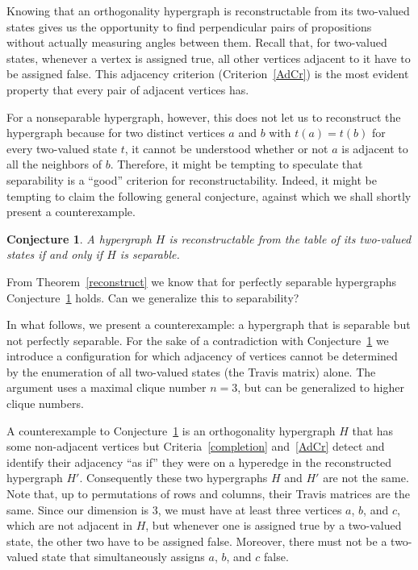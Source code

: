 \documentclass[%
12pt,
prereprint,
showpacs,
showkeys,
preprintnumbers,
amsmath,amssymb,
aps,
pra,
longbibliography,
notitlepage
]{revtex4-1}
\newtheorem{conjecture}[theorem]{{\color{THM}Conjecture}}
\theoremstyle{definition}
\begin{document}
	Knowing that an orthogonality hypergraph is reconstructable from its  two-valued states gives us the opportunity to find perpendicular pairs of propositions without actually measuring angles between them.
	Recall that, for two-valued states, whenever a vertex is assigned true, all other vertices adjacent to it have to be assigned false. This adjacency criterion (Criterion~\ref{AdCr}) is the most evident property that every pair of adjacent vertices has.
	
	For a nonseparable hypergraph, however, this does not let us to reconstruct the hypergraph because for two distinct vertices $a$ and $b$ with $t(a)=t(b)$ for every two-valued state $t$, it cannot be understood whether or not $a$ is adjacent to all the neighbors of $b$.
	Therefore, it might be tempting to speculate that separability is a ``good'' criterion for reconstructability. Indeed, it might be tempting to claim the following general conjecture, against which we shall shortly present a counterexample.
	
	\begin{conjecture} \label{c2} A hypergraph $H$ is reconstructable from the table of its two-valued states if and only if $H$ is separable.
	\end{conjecture}
	
	From Theorem~\ref{reconstruct} we know that for perfectly separable hypergraphs Conjecture~\ref{c2} holds.
	Can we generalize this to separability?
	
	In what follows, we present a counterexample: a hypergraph that is separable but not perfectly separable. For the sake of a contradiction with Conjecture~\ref{c2} we introduce a configuration for which adjacency of vertices cannot be determined by the enumeration of all two-valued states (the Travis matrix) alone. The argument uses a maximal clique number $n=3$, but can be generalized to higher clique numbers.
	
	A counterexample to Conjecture~\ref{c2} is an orthogonality hypergraph $H$ that has some non-adjacent vertices but Criteria~\ref{completion} and~\ref{AdCr} detect and identify their adjacency ``as if'' they were  on a hyperedge in the reconstructed hypergraph $H'$.  Consequently these two hypergraphs $H$ and $H'$ are not the same. Note that, up to permutations of rows and columns, their Travis matrices are the same. Since our dimension is 3, we must have at least three vertices $a$, $b$, and $c$, which are not adjacent in $H$, but whenever one is assigned true by a two-valued state, the other two  have to be assigned false. Moreover, there must not be a two-valued state that simultaneously assigns $a$, $b$, and $c$ false.
	
\end{document}
